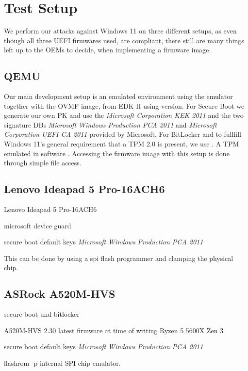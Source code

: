 
\chapter{Test Setup}
\label{sec:test-setup}

We perform our attacks against Windows 11 on three different setups, as even though all three \ac{UEFI} firmwares used, are \cite{pi-spec} compliant, there still are many things left up to the \acp{OEM} to decide, when implementing a firmware image.

\section{\acs{QEMU}}
\label{sec:test-setup:qemu}

Our main development setup is an emulated environment using the emulator  \cite{qemu} together with the \ac{OVMF} image, from \ac{EDK} II using version.
For Secure Boot we generate our own \ac{PK} and use the \emph{Microsoft Corporation \acs{KEK}  2011} and the two signature \acp{DB} \emph{Microsoft Windows Production PCA 2011} and \emph{Microsoft Corporation UEFI CA 2011} provided by Microsoft.
For BitLocker and to fullfill Windows 11's general requirement that a \ac{TPM} 2.0 is present, we use .
A \ac{TPM} emulated in software \cite{swtpm}.
Accessing the firmware image with this setup is done through simple file access.

\section{Lenovo Ideapad 5 Pro-16ACH6}
\label{sec:test-setup:lenovo}

Lenovo Ideapad 5 Pro-16ACH6


microsoft device guard

secure boot default keys
\emph{Microsoft Windows Production PCA 2011}

This can be done by using a spi flash programmer and clamping the physical chip. 

\section{ASRock A520M-HVS}
\label{sec:test-setup:asrock}



secure boot und bitlocker


A520M-HVS 2.30 latest firmware at time of writing
Ryzen 5 5600X Zen 3

secure boot default keys
\emph{Microsoft Windows Production PCA 2011}


flashrom -p internal
SPI chip emulator. 
